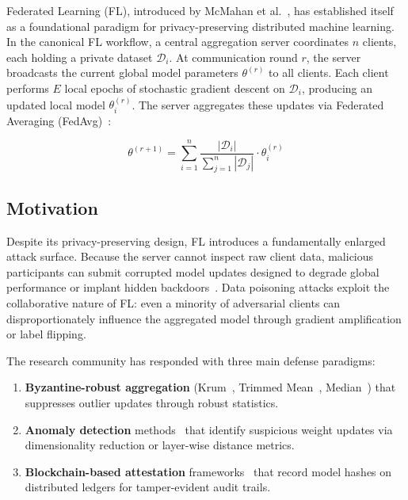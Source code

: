 \documentclass[conference]{IEEEtran}
\begin{document}
Federated Learning (FL), introduced by McMahan et al.~\cite{mcmahan2017fl}, has established itself as a foundational paradigm for privacy-preserving distributed machine learning. In the canonical FL workflow, a central aggregation server coordinates $n$ clients, each holding a private dataset $\mathcal{D}_i$. At communication round $r$, the server broadcasts the current global model parameters $\theta^{(r)}$ to all clients. Each client performs $E$ local epochs of stochastic gradient descent on $\mathcal{D}_i$, producing an updated local model $\theta_i^{(r)}$. The server aggregates these updates via Federated Averaging (FedAvg)~\cite{mcmahan2017fl}:

\begin{equation}
\theta^{(r+1)} = \sum_{i=1}^{n} \frac{|\mathcal{D}_i|}{\sum_{j=1}^{n} |\mathcal{D}_j|} \cdot \theta_i^{(r)}
\label{eq:fedavg}
\end{equation}

\subsection{Motivation}
Despite its privacy-preserving design, FL introduces a fundamentally enlarged attack surface. Because the server cannot inspect raw client data, malicious participants can submit corrupted model updates designed to degrade global performance or implant hidden backdoors~\cite{bagdasaryan2020backdoor, bhagoji2019poisoning}. Data poisoning attacks exploit the collaborative nature of FL: even a minority of adversarial clients can disproportionately influence the aggregated model through gradient amplification or label flipping.

The research community has responded with three main defense paradigms:
\begin{enumerate}
    \item \textbf{Byzantine-robust aggregation} (Krum~\cite{blanchard2017krum}, Trimmed Mean~\cite{yin2018trimmed}, Median~\cite{yin2018trimmed}) that suppresses outlier updates through robust statistics.
    \item \textbf{Anomaly detection} methods~\cite{li2020flguard, tolanietal2020} that identify suspicious weight updates via dimensionality reduction or layer-wise distance metrics.
    \item \textbf{Blockchain-based attestation} frameworks~\cite{ramanan2022blockchainfl, majeed2021blockchainfl} that record model hashes on distributed ledgers for tamper-evident audit trails.
\end{enumerate}
\end{document}
